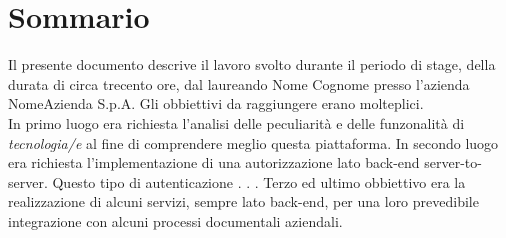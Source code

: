 
\cleardoublepage
{}
{}
\begingroup
\let\clearpage\relax
\let\cleardoublepage\relax
\let\cleardoublepage\relax

\chapter*{Sommario}

Il presente documento descrive il lavoro svolto durante il periodo di stage, della durata di circa trecento ore, dal laureando Nome Cognome presso l'azienda NomeAzienda S.p.A.
Gli obbiettivi da raggiungere erano molteplici.\\
In primo luogo era richiesta l'analisi delle peculiarità e delle funzonalità di \emph{tecnologia/e} al fine di comprendere meglio questa piattaforma.
In secondo luogo era richiesta l'implementazione di una autorizzazione lato back-end server-to-server.
Questo tipo di autenticazione . . .
Terzo ed ultimo obbiettivo era la realizzazione di alcuni servizi, sempre lato back-end, per una loro prevedibile integrazione con alcuni processi documentali aziendali.

%
%

\endgroup			

\vfill

